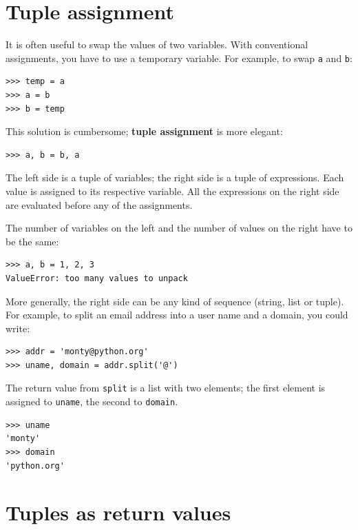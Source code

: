 \documentclass[10pt]{book}
\begin{document}
\section{Tuple assignment}
\label{tuple.assignment}

It is often useful to swap the values of two variables.
With conventional assignments, you have to use a temporary
variable.  For example, to swap {\tt a} and {\tt b}:

\begin{verbatim}
>>> temp = a
>>> a = b
>>> b = temp
\end{verbatim}
%
This solution is cumbersome; {\bf tuple assignment} is more elegant:

\begin{verbatim}
>>> a, b = b, a
\end{verbatim}
%
The left side is a tuple of variables; the right side is a tuple of
expressions.  Each value is assigned to its respective variable.
All the expressions on the right side are evaluated before any
of the assignments.

The number of variables on the left and the number of
values on the right have to be the same:

\begin{verbatim}
>>> a, b = 1, 2, 3
ValueError: too many values to unpack
\end{verbatim}
%
More generally, the right side can be any kind of sequence
(string, list or tuple).  For example, to split an email address
into a user name and a domain, you could write:

\begin{verbatim}
>>> addr = 'monty@python.org'
>>> uname, domain = addr.split('@')
\end{verbatim}
%
The return value from {\tt split} is a list with two elements;
the first element is assigned to {\tt uname}, the second to
{\tt domain}.

\begin{verbatim}
>>> uname
'monty'
>>> domain
'python.org'
\end{verbatim}
%

\section{Tuples as return values}
\end{document}
